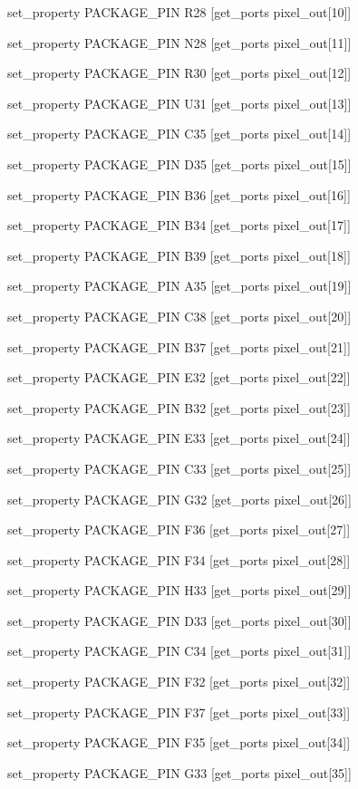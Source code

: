 set\_property PACKAGE\_PIN R28 [get\_ports {pixel\_out[10]}]

set\_property PACKAGE\_PIN N28 [get\_ports {pixel\_out[11]}]


set\_property PACKAGE\_PIN R30 [get\_ports {pixel\_out[12]}]

set\_property PACKAGE\_PIN U31 [get\_ports {pixel\_out[13]}]

set\_property PACKAGE\_PIN C35 [get\_ports {pixel\_out[14]}]

set\_property PACKAGE\_PIN D35 [get\_ports {pixel\_out[15]}]

set\_property PACKAGE\_PIN B36 [get\_ports {pixel\_out[16]}]

set\_property PACKAGE\_PIN B34 [get\_ports {pixel\_out[17]}]

set\_property PACKAGE\_PIN B39 [get\_ports {pixel\_out[18]}]

set\_property PACKAGE\_PIN A35 [get\_ports {pixel\_out[19]}]

set\_property PACKAGE\_PIN C38 [get\_ports {pixel\_out[20]}]

set\_property PACKAGE\_PIN B37 [get\_ports {pixel\_out[21]}]

set\_property PACKAGE\_PIN E32 [get\_ports {pixel\_out[22]}]

set\_property PACKAGE\_PIN B32 [get\_ports {pixel\_out[23]}]

set\_property PACKAGE\_PIN E33 [get\_ports {pixel\_out[24]}]

set\_property PACKAGE\_PIN C33 [get\_ports {pixel\_out[25]}]

set\_property PACKAGE\_PIN G32 [get\_ports {pixel\_out[26]}]

set\_property PACKAGE\_PIN F36 [get\_ports {pixel\_out[27]}]

set\_property PACKAGE\_PIN F34 [get\_ports {pixel\_out[28]}]

set\_property PACKAGE\_PIN H33 [get\_ports {pixel\_out[29]}]

set\_property PACKAGE\_PIN D33 [get\_ports {pixel\_out[30]}]

set\_property PACKAGE\_PIN C34 [get\_ports {pixel\_out[31]}]

set\_property PACKAGE\_PIN F32 [get\_ports {pixel\_out[32]}]

set\_property PACKAGE\_PIN F37 [get\_ports {pixel\_out[33]}]

set\_property PACKAGE\_PIN F35 [get\_ports {pixel\_out[34]}]

set\_property PACKAGE\_PIN G33 [get\_ports {pixel\_out[35]}]

